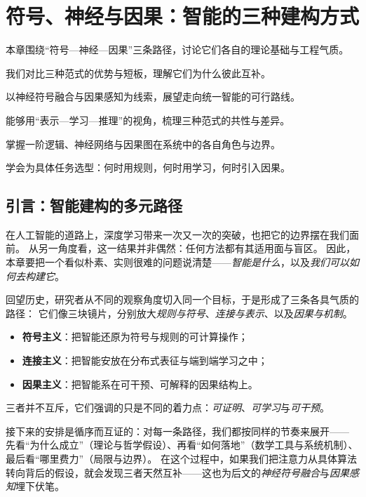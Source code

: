 \chapter{符号、神经与因果：智能的三种建构方式}

\begin{introduction}
  \item 本章围绕“符号—神经—因果”三条路径，讨论它们各自的理论基础与工程气质。
  \item 我们对比三种范式的优势与短板，理解它们为什么彼此互补。
  \item 以神经符号融合与因果感知为线索，展望走向统一智能的可行路线。
\end{introduction}

\begin{introduction}
  \item 能够用“表示—学习—推理”的视角，梳理三种范式的共性与差异。
  \item 掌握一阶逻辑、神经网络与因果图在系统中的各自角色与边界。
  \item 学会为具体任务选型：何时用规则，何时用学习，何时引入因果。
\end{introduction}

\section{引言：智能建构的多元路径}

在人工智能的道路上，深度学习带来一次又一次的突破，也把它的边界摆在我们面前。  
从另一角度看，这一结果并非偶然：任何方法都有其适用面与盲区。  
因此，本章要把一个看似朴素、实则很难的问题说清楚——\emph{智能是什么}，以及\emph{我们可以如何去构建它}。

回望历史，研究者从不同的观察角度切入同一个目标，于是形成了三条各具气质的路径：  
它们像三块镜片，分别放大\emph{规则与符号}、\emph{连接与表示}、以及\emph{因果与机制}。

\begin{itemize}
\item \textbf{符号主义}：把智能还原为符号与规则的可计算操作；
\item \textbf{连接主义}：把智能安放在分布式表征与端到端学习之中；
\item \textbf{因果主义}：把智能系在可干预、可解释的因果结构上。
\end{itemize}
三者并不互斥，它们强调的只是不同的着力点：\emph{可证明}、\emph{可学习}与\emph{可干预}。

接下来的安排是循序而互证的：对每一条路径，我们都按同样的节奏来展开——  
先看“为什么成立”（理论与哲学假设）、再看“如何落地”（数学工具与系统机制）、最后看“哪里费力”（局限与边界）。  
在这个过程中，如果我们把注意力从具体算法转向背后的假设，就会发现三者天然互补——这也为后文的\emph{神经符号融合}与\emph{因果感知}埋下伏笔。

